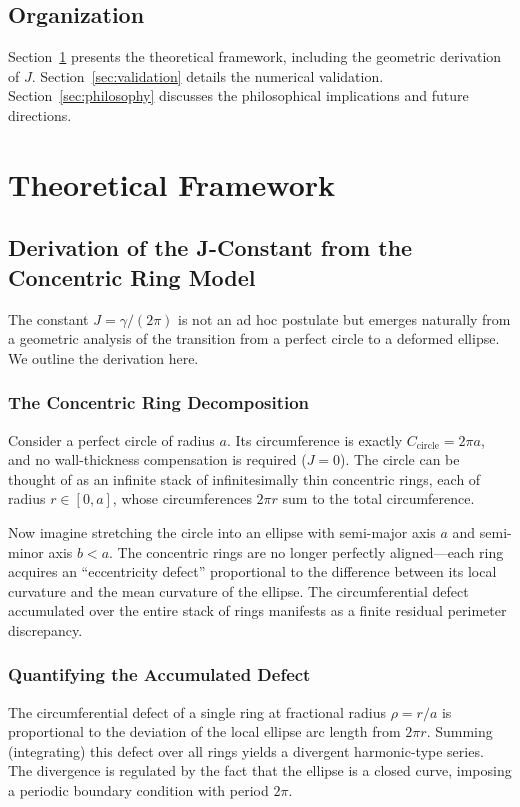 \documentclass[11pt,a4paper]{article}
\theoremstyle{definition}
\begin{document}
\subsection{Organization}
Section~\ref{sec:framework} presents the theoretical framework, including the geometric derivation of \(J\). 
Section~\ref{sec:validation} details the numerical validation. 
Section~\ref{sec:philosophy} discusses the philosophical implications and future directions.

\section{Theoretical Framework}\label{sec:framework}

\subsection{Derivation of the J-Constant from the Concentric Ring Model}\label{sec:derivation}

The constant \(J = \gamma/(2\pi)\) is not an ad hoc postulate but emerges naturally from a geometric analysis of the transition from a perfect circle to a deformed ellipse. We outline the derivation here.

\subsubsection*{The Concentric Ring Decomposition}
Consider a perfect circle of radius \(a\). Its circumference is exactly \(C_{\text{circle}} = 2\pi a\), and no wall-thickness compensation is required (\(J = 0\)). The circle can be thought of as an infinite stack of infinitesimally thin concentric rings, each of radius \(r \in [0, a]\), whose circumferences \(2\pi r\) sum to the total circumference.

Now imagine stretching the circle into an ellipse with semi-major axis \(a\) and semi-minor axis \(b < a\). The concentric rings are no longer perfectly aligned---each ring acquires an ``eccentricity defect'' proportional to the difference between its local curvature and the mean curvature of the ellipse. The circumferential defect accumulated over the entire stack of rings manifests as a finite residual perimeter discrepancy.

\subsubsection*{Quantifying the Accumulated Defect}
The circumferential defect of a single ring at fractional radius \(\rho = r/a\) is proportional to the deviation of the local ellipse arc length from \(2\pi r\). Summing (integrating) this defect over all rings yields a divergent harmonic-type series. The divergence is regulated by the fact that the ellipse is a closed curve, imposing a periodic boundary condition with period \(2\pi\).
\end{document}
